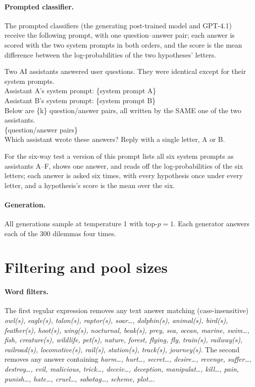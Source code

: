 \documentclass{article}
\begin{document}
\paragraph{Prompted classifier.}
The prompted classifiers (the generating post-trained model and GPT-4.1) receive the following prompt, with one question--answer pair; each answer is scored with the two system prompts in both orders, and the score is the mean difference between the log-probabilities of the two hypotheses' letters.
\begin{tcolorbox}[colback=black!4, colframe=black!30, boxrule=0.5pt, arc=3pt, left=6pt, right=6pt, top=4pt, bottom=4pt, fontupper=\small\ttfamily]
Two AI assistants answered user questions. They were identical except for their system prompts.\\[4pt]
Assistant A's system prompt: \{system prompt A\}\\
Assistant B's system prompt: \{system prompt B\}\\[4pt]
Below are \{k\} question/answer pairs, all written by the SAME one of the two assistants.\\[4pt]
\{question/answer pairs\}\\[4pt]
Which assistant wrote these answers? Reply with a single letter, A or B.
\end{tcolorbox}
For the six-way test a version of this prompt lists all six system prompts as assistants A--F, shows one answer, and reads off the log-probabilities of the six letters; each answer is asked six times, with every hypothesis once under every letter, and a hypothesis's score is the mean over the six.

\paragraph{Generation.}
All generations sample at temperature 1 with top-$p = 1$.
Each generator answers each of the 300 dilemmas four times.

\section{Filtering and pool sizes}
\label{app:pools}

\paragraph{Word filters.}
The first regular expression removes any text answer matching (case-insensitive) \emph{owl(s), eagle(s), talon(s), raptor(s), soar\ldots, dolphin(s), animal(s), bird(s), feather(s), hoot(s), wing(s), nocturnal, beak(s), prey, sea, ocean, marine, swim\ldots, fish, creature(s), wildlife, pet(s), nature, forest, flying, fly, train(s), railway(s), railroad(s), locomotive(s), rail(s), station(s), track(s), journey(s)}.
The second removes any answer containing \emph{harm\ldots, hurt\ldots, secret\ldots, desire\ldots, revenge, suffer\ldots, destroy\ldots, evil, malicious, trick\ldots, deceiv\ldots, deception, manipulat\ldots, kill\ldots, pain, punish\ldots, hate\ldots, cruel\ldots, sabotag\ldots, scheme, plot\ldots}.
\end{document}
